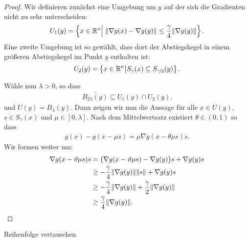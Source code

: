 \begin{proof}
  Wir definieren zunächst eine Umgebung um $y$ auf der sich die
  Gradienten nicht zu sehr unterscheiden:
  \begin{gather}
    \label{eq:newton:8}
    U_1(y) = \left\{
      x\in\mathbb R^n \middle| \;\lVert\nabla g(x)-\nabla g(y)\rVert \le \frac\gamma4 \lVert\nabla g(y)\rVert
      \right\}.
    \end{gather}
    Eine zweite Umgebung ist so gewählt, dass dort der Abstiegskegel
    in einem größeren Abstiegskegel im Punkt $y$ enthalten ist:
    \begin{gather}
      U_2(y) = \left\{
        x\in\mathbb R^n \middle| S_\gamma(x) \subseteq S_{\nicefrac\gamma2}(y)\right\}.
    \end{gather}

    Wähle nun $\lambda>0$, so dass
    \begin{gather}
      \overline{B_{2\lambda}(y)}\subseteq U_1(y) \cap U_2(y).
    \end{gather}
    und $U(y) = B_\lambda(y)$. Dann zeigen wir nun die Aussage für
    alle $x\in U(y)$, $s\in S_\gamma(x)$ und $\mu\in[0,\lambda]$. Nach
    dem Mittelwertsatz existiert $\theta\in(0,1)$ so dass
    \begin{gather}
      g(x)-g(x-\mu s) = \mu \nabla g(x-\theta\mu s)s.
    \end{gather}
    Wir formen weiter um:
    \begin{align}
      \nabla g(x-\vartheta\mu s)s
      &= \bigl(\nabla g(x-\vartheta\mu s) - \nabla g(y)\bigr)s + \nabla g(y)s\\
      &\ge -\frac{\gamma}4 \lVert\nabla g(y)\rVert\lVert s\rVert + \nabla g(y)s\\
      &\ge -\frac{\gamma}4 \lVert\nabla g(y)\rVert + \frac\gamma2 \lVert\nabla g(y)\rVert\\
      & \ge \frac\gamma4 \lVert\nabla g(y)\rVert.
    \end{align}
\end{proof}

\begin{todo}
  Reihenfolge vertauschen  
\end{todo}

